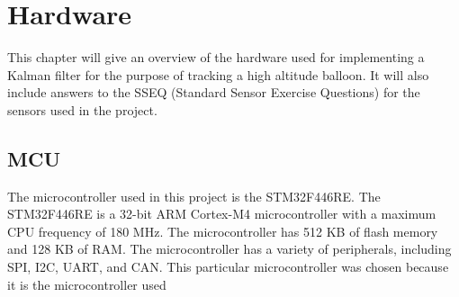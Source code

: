 \chapter{Hardware}\label{ch:hardware}
This chapter will give an overview of the hardware used for implementing a Kalman filter for the purpose of tracking a high altitude balloon.
It will also include answers to the SSEQ (Standard Sensor Exercise Questions) for the sensors used in the project.

\section{MCU}\label{sec:mcu}
The microcontroller used in this project is the STM32F446RE. The STM32F446RE is a 32-bit ARM Cortex-M4 microcontroller with a maximum CPU frequency of 180 MHz. The microcontroller has 512 KB of flash memory and 128 KB of RAM. The microcontroller has a variety of peripherals, including SPI, I2C, UART, and CAN. 
This particular microcontroller was chosen because it is the microcontroller used 





